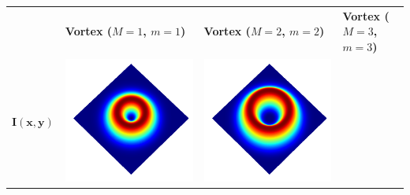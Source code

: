 \documentclass[a4paper, 12pt]{article}
\begin{document}
\begin{center}
\begin{tabular}{M{1.5cm}M{5cm}M{5cm}M{5cm}}
\ & \textbf{Vortex ($M=1$, $m=1$)} & \textbf{Vortex ($M=2$, $m=2$)} & \textbf{Vortex ($M=3$, $m=3$)} \tabularnewline
{}$\mathbf{I(x,y)}$ &
\includegraphics[width=\linewidth]{../resources/intensity_M=1.png} & 
\includegraphics[width=\linewidth]{../resources/intensity_M=2.png} & 

\end{tabular}
\end{center}
\end{document}
